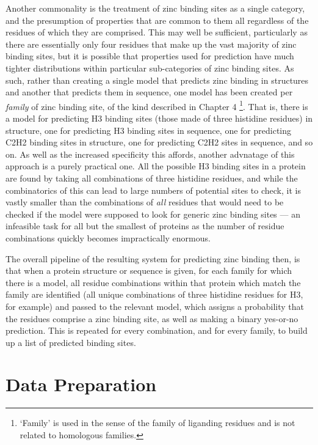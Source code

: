 Another commonality is the treatment of zinc binding sites as a single category, and the presumption of properties that are common to them all regardless of the residues of which they are comprised. This may well be sufficient, particularly as there are essentially only four residues that make up the vast majority of zinc binding sites, but it is possible that properties used for prediction have much tighter distributions within particular sub-categories of zinc binding sites. As such, rather than creating a single model that predicts zinc binding in structures and another that predicts them in sequence, one model has been created per \emph{family} of zinc binding site, of the kind described in Chapter 4 \footnote{`Family' is used in the sense of the family of liganding residues and is not related to homologous families.}. That is, there is a model for predicting H3 binding sites (those made of three histidine residues) in structure, one for predicting H3 binding sites in sequence, one for predicting C2H2 binding sites in structure, one for predicting C2H2 sites in sequence, and so on. As well as the increased specificity this affords, another advnatage of this approach is a purely practical one. All the possible H3 binding sites in a protein are found by taking all combinations of three histidine residues, and while the combinatorics of this can lead to large numbers of potential sites to check, it is vastly smaller than the combinations of \emph{all} residues that would need to be checked if the model were supposed to look for generic zinc binding sites --- an infeasible task for all but the smallest of proteins as the number of residue combinations quickly becomes impractically enormous.

The overall pipeline of the resulting system for predicting zinc binding then, is that when a protein structure or sequence is given, for each family for which there is a model, all residue combinations within that protein which match the family are identified (all unique combinations of three histidine residues for H3, for example) and passed to the relevant model, which assigns a probability that the residues comprise a zinc binding site, as well as making a binary yes-or-no prediction. This is repeated for every combination, and for every family, to build up a list of predicted binding sites.

\section{Data Preparation}

